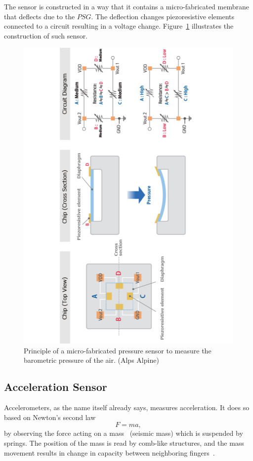 \documentclass[DIV=14]{scrartcl}
\begin{document}
    The sensor is constructed in a way that it contains a micro-fabricated membrane that deflects due to the $PSG$.
    The deflection changes piezoresistive elements connected to a circuit resulting in a voltage change.
    Figure~\ref{fig:barometer} illustrates the construction of such sensor.

    \begin{figure}[!h]
        \centering
        \includegraphics[width=.8\textwidth]{figures/pressureSensor}
        \caption{Principle of a micro-fabricated pressure sensor to measure the barometric pressure
                 of the air. (Alps Alpine)}
        \label{fig:barometer}
    \end{figure}

    \subsection{Acceleration Sensor}
    Accelerometers, as the name itself already says, measures acceleration.
    It does so based on Newton's second law
    \begin{equation}
        F = ma
        \label{eq:newtonsLaw},
    \end{equation}
    by observing the force acting on a mass~\cite{labManual} (seismic mass) which is suspended by springs.
    The position of the mass is read by comb-like structures, and the mass movement results in change in capacity
    between neighboring fingers~\cite{labManual}.
\end{document}
